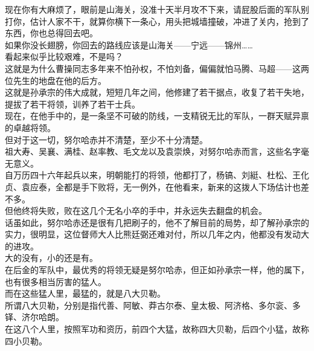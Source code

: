 \begin{multicols}{\theparacolNo}
现在你有大麻烦了，眼前是山海关，没准十天半月攻不下来，请屁股后面的军队别打你，估计人家不干，就算你横下一条心，用头把城墙撞破，冲进了关内，抢到了东西，你也总得回去吧。\\

如果你没长翅膀，你回去的路线应该是山海关——宁远——锦州……\\

看起来似乎比较艰难，不是吗？\\

这就是为什么曹操同志多年来不怕孙权，不怕刘备，偏偏就怕马腾、马超——这两位先生的地盘在他的后方。\\

这就是孙承宗的伟大成就，短短几年之间，他修建了若干据点，收复了若干失地，提拔了若干将领，训养了若干士兵。\\

现在，在他手中的，是一条坚不可破的防线，一支精锐无比的军队，一群天赋异禀的卓越将领。\\

但对于这一切，努尔哈赤并不清楚，至少不十分清楚。\\

祖大寿、吴襄、满桂、赵率教、毛文龙以及袁崇焕，对努尔哈赤而言，这些名字毫无意义。\\

自万历四十六年起兵以来，明朝能打的将领，他都打了，杨镐、刘綎、杜松、王化贞、袁应泰，全都是手下败将，无一例外，在他看来，新来的这拨人下场估计也差不多。\\

但他终将失败，败在这几个无名小卒的手中，并永远失去翻盘的机会。\\

话虽如此，努尔哈赤还是很有几把刷子的，他不了解目前的局势，却了解孙承宗的实力，很明显，这位督师大人比熊廷弼还难对付，所以几年之内，他都没有发动大的进攻。\\

大的没有，小的还是有。\\

在后金的军队中，最优秀的将领无疑是努尔哈赤，但正如孙承宗一样，他的属下，也有很多相当厉害的猛人。\\

而在这些猛人里，最猛的，就是八大贝勒。\\

所谓八大贝勒，分别是指代善、阿敏、莽古尔泰、皇太极、阿济格、多尔衮、多铎、济尔哈朗。\\

在这八个人里，按照军功和资历，前四个大猛，故称四大贝勒，后四个小猛，故称四小贝勒。\\


\end{multicols}
